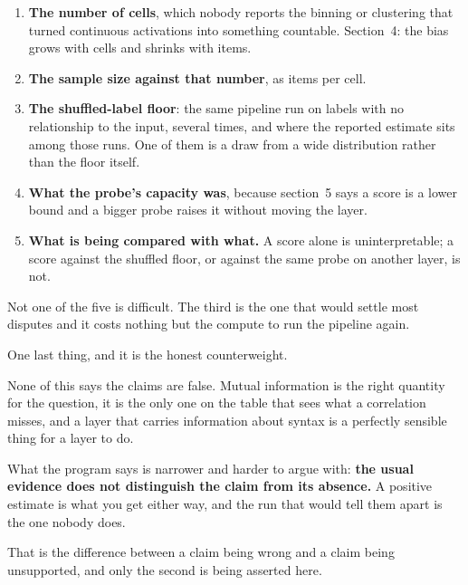 \begin{fr}
\begin{ansblock}
\begin{enumerate}
\item \textbf{The number of cells}, which nobody reports \dash{} the binning
  or clustering that turned continuous activations into something countable.
  Section~4: the bias grows with cells and shrinks with items.
\item \textbf{The sample size against that number}, as items per cell.
\item \textbf{The shuffled-label floor}: the same pipeline run on labels with
  no relationship to the input, several times, and where the reported
  estimate sits among those runs. One of them is a draw from a wide
  distribution rather than the floor itself.
\item \textbf{What the probe's capacity was}, because section~5 says a
  score is a lower bound and a bigger probe raises it without moving the
  layer.
\item \textbf{What is being compared with what.} A score alone is
  uninterpretable; a score against the shuffled floor, or against the same
  probe on another layer, is not.
\end{enumerate}
\end{ansblock}

Not one of the five is difficult. The third is the one that would settle
most disputes and it costs nothing but the compute to run the pipeline
again.
\end{fr}

\begin{fr}
One last thing, and it is the honest counterweight.

None of this says the claims are false. Mutual information is the right
quantity for the question, it is the only one on the table that sees what a
correlation misses, and a layer that carries information about syntax is a
perfectly sensible thing for a layer to do.

What the program says is narrower and harder to argue with: \textbf{the usual
evidence does not distinguish the claim from its absence.} A positive
estimate is what you get either way, and the run that would tell them apart
is the one nobody does.

That is the difference between a claim being wrong and a claim being
unsupported, and only the second is being asserted here.
\end{fr}

